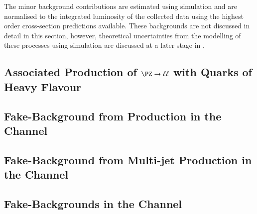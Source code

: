 The minor background contributions are estimated using simulation and
are normalised to the integrated luminosity of the collected data
using the highest order cross-section predictions available. These
backgrounds are not discussed in detail in this section, however,
theoretical uncertainties from the modelling of these processes using
simulation are discussed at a later stage in
.




\subsection{Associated Production of $\PZ \to \ell\ell$ with Quarks of Heavy Flavour}%
\label{sec:bkg_zjets}


\subsection{Fake-\tauhadvis Background from \ttbar Production in the \hadhad Channel}%
\label{sec:bkg_hadhad_ttbarfakes}


\subsection{Fake-\tauhadvis Background from Multi-jet Production in the \hadhad Channel}%
\label{sec:bkg_hadhad_ff}


\subsection{Fake-\tauhadvis Backgrounds in the \lephad Channel}%
\label{sec:bkg_lephad_combined_ff}



